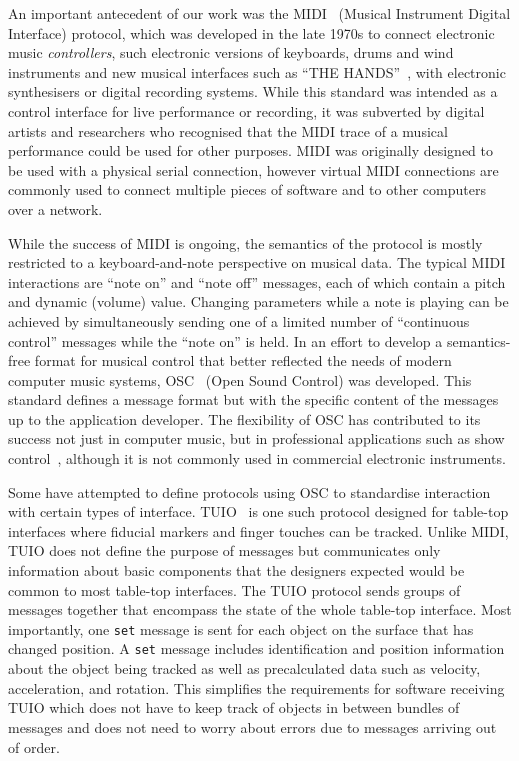 \documentclass[graybox]{svmult}
\begin{document}

An important antecedent of our work was the
MIDI~\cite{midi1996complete} (Musical Instrument Digital Interface)
protocol, which was developed in the late 1970s to connect electronic
music \emph{controllers}, such electronic versions of keyboards, drums
and wind instruments and new musical interfaces such as ``THE
HANDS''~\cite{TheHandsArticle}, with electronic synthesisers or
digital recording systems. While this standard was intended as a
control interface for live performance or recording, it was subverted
by digital artists and researchers who recognised that the MIDI trace
of a musical performance could be used for other purposes. MIDI was
originally designed to be used with a physical serial connection,
however virtual MIDI connections are commonly used to connect multiple
pieces of software and to other computers over a
network\cite{Lazzaro:2004pb}.

While the success of MIDI is ongoing, the semantics of the protocol is
mostly restricted to a keyboard-and-note perspective on musical data.
The typical MIDI interactions are ``note on'' and ``note off''
messages, each of which contain a pitch and dynamic (volume) value.
Changing parameters while a note is playing can be achieved by
simultaneously sending one of a limited number of ``continuous
control'' messages while the ``note on'' is held. In an effort to
develop a semantics-free format for musical control that better
reflected the needs of modern computer music systems,
OSC~\cite{osc-nime2009} (Open Sound Control) was developed. This
standard defines a message format but with the specific content of the
messages up to the application developer. The flexibility of OSC has
contributed to its success not just in computer music, but in
professional applications such as show
control~\cite{schmeder2010best}, although it is not commonly used in
commercial electronic instruments.

Some have attempted to define protocols using OSC to standardise
interaction with certain types of interface. TUIO~\cite{TUIO_KBBC05}
is one such protocol designed for table-top interfaces where fiducial
markers and finger touches can be tracked. Unlike MIDI, TUIO does not
define the purpose of messages but communicates only information about
basic components that the designers expected would be common to most
table-top interfaces. The TUIO protocol sends groups of messages
together that encompass the state of the whole table-top interface.
Most importantly, one \texttt{set} message is sent for each object on
the surface that has changed position. A \texttt{set} message includes
identification and position information about the object being tracked
as well as precalculated data such as velocity, acceleration, and
rotation. This simplifies the requirements for software receiving TUIO
which does not have to keep track of objects in between bundles of
messages and does not need to worry about errors due to messages arriving out of order.
\end{document}
